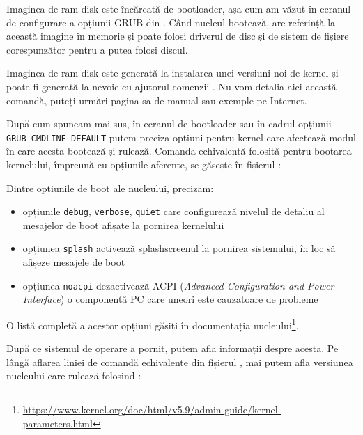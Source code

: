 Imaginea de ram disk este încărcată de bootloader, așa cum am văzut în ecranul
de configurare a opțiunii GRUB din . Când nucleul
bootează, are referință la această imagine în memorie și poate folosi driverul de
disc și de sistem de fișiere corespunzător pentru a putea folosi discul.

Imaginea de ram disk este generată la instalarea unei versiuni noi de kernel și
poate fi generată la nevoie cu ajutorul comenzii . Nu vom detalia
aici această comandă, puteți urmări pagina sa de manual sau exemple pe Internet.

După cum spuneam mai sus, în ecranul de bootloader sau în cadrul opțiunii
\texttt{GRUB\_CMDLINE\_DEFAULT} putem preciza opțiuni pentru kernel care afectează modul în
care acesta bootează și rulează. Comanda echivalentă folosită pentru bootarea
kernelului, împreună cu opțiunile aferente, se găsește în fișierul
:


Dintre opțiunile de boot ale nucleului, precizăm:

\begin{itemize}
  \item opțiunile \texttt{debug}, \texttt{verbose}, \texttt{quiet} care configurează nivelul de
		detaliu al mesajelor de boot afișate la pornirea kernelului
  \item opțiunea \texttt{splash} activează splashscreenul la pornirea sistemului,
		în loc să afișeze mesajele de boot
  \item opțiunea \texttt{noacpi} dezactivează ACPI  (\textit{Advanced Configuration and
                Power Interface}) o componentă PC care uneori este cauzatoare de
		probleme
\end{itemize}

O listă completă a acestor opțiuni găsiți în documentația nucleului\footnote{\url{https://www.kernel.org/doc/html/v5.9/admin-guide/kernel-parameters.html}}.

După ce sistemul de operare a pornit, putem afla informații despre acesta. Pe
lângă aflarea liniei de comandă echivalente din fișierul , mai
putem afla versiunea nucleului care rulează folosind :

